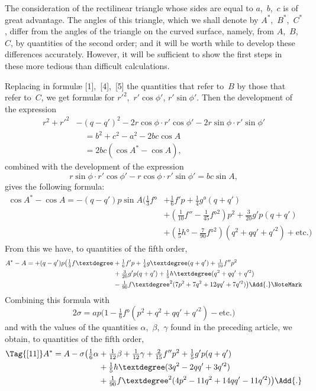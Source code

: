 
The consideration of the rectilinear triangle whose sides are equal to $a$,~$b$,~$c$ is of
great advantage. The angles of this triangle, which we shall denote by $A^{*}$,~$B^{*}$,~$C^{*}$,
differ from the angles of the triangle on the curved surface, namely, from $A$,~$B$,~$C$,
by quantities of the second order; and it will be worth while to develop these differences
accurately. However, it will be sufficient to show the first steps in these more
tedious than difficult calculations.

Replacing in formulæ [1],~[4],~[5] the quantities that refer to~$B$ by those that
refer to~$C$, we get formulæ for $r'^{2}$,~$r'\cos\phi'$, $r'\sin\phi'$. Then the development of the
expression
\begin{align*}
  r^{2} + r'^{2} &- (q - q')^{2}
    - 2r\cos\phi·r'\cos\phi'
    - 2r\sin\phi·r'\sin\phi' \\
    &\quad= b^{2} + c^{2} - a^{2} - 2bc\cos A \\
    &\quad= 2bc(\cos A^{*} - \cos A),
\end{align*}
combined with the development of the expression
\[
r\sin\phi·r'\cos\phi' - r\cos\phi·r'\sin\phi' = bc\sin A,
\]
gives the following formula:
\begin{align*}
\cos A^{*} - \cos A
  = -(q - q')p\sin A
  \bigl(\tfrac{1}{3}f° &+ \tfrac{1}{6}f'p + \tfrac{1}{4}g°(q + q') \\
  &+ (\tfrac{1}{10}f'' - \tfrac{1}{45}{f°}^{2})p^{2}
   + \tfrac{3}{20}g'p(q + q') \\
  &+ (\tfrac{1}{5}h° - \tfrac{7}{90}{f°}^{2})(q^{2} + qq' + q'^{2})
   + \text{etc.}\bigr)
\end{align*}
From this we have, to quantities of the fifth order,
\begin{align*}
A^{*} - A = +(q - q')p
  \bigl(\tfrac{1}{3}f°
  &+ \tfrac{1}{6}f'p + \tfrac{1}{4}g°(q + q') + \tfrac{1}{10}f''p^{2} \\
  &+ \tfrac{3}{20}g'p(q + q') + \tfrac{1}{5}h°(q^{2} + qq' + q'^{2}) \\
  &- \tfrac{1}{90}{f°}^{2}(7p^{2} + 7q^{2} + 12qq' + 7q'^{2})\bigr)\Add{.}\NoteMark
\end{align*}
Combining this formula with
\[
2\sigma = ap\bigl(1 - \tfrac{1}{6}f°(p^{2} + q^{2} + qq' + q'^{2})- \text{etc.}\bigr)
\]
and with the values of the quantities $\alpha$,~$\beta$,~$\gamma$ found in the preceding article, we obtain,
to quantities of the fifth order,
\begin{align*}
\Tag{[11]}
A^{*} = A - \sigma\bigl(\tfrac{1}{6}\alpha
  &+ \tfrac{1}{12}\beta
   + \tfrac{1}{12}\gamma + \tfrac{2}{15}f''p^{2} + \tfrac{1}{5}g'p(q + q') \\
  &+ \tfrac{1}{5}h°(3q^{2} - 2qq' + 3q'^{2}) \\
  &+ \tfrac{1}{90}{f°}^{2}(4p^{2} - 11q^{2} + 14qq' - 11q'^{2})\bigr)\Add{.}
\end{align*}
